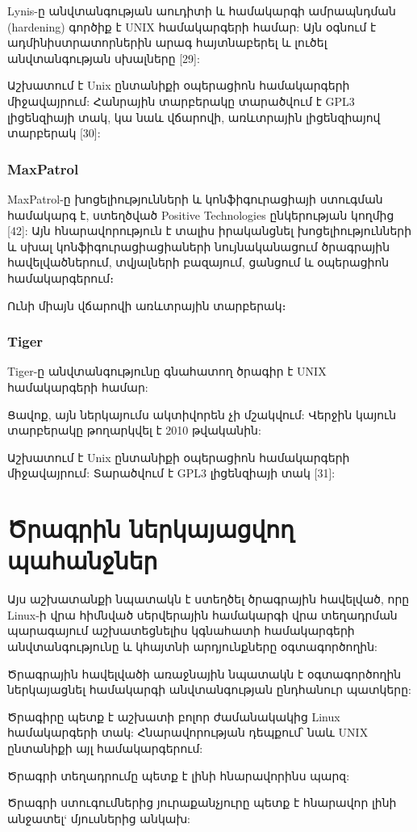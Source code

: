 \documentclass[a4paper,12pt]{article}
\begin{document}
\begin{sloppypar}
Lynis-ը անվտանգության աուդիտի և համակարգի ամրապնդման (hardening)
գործիք է UNIX համակարգերի համար:
Այն օգնում է ադմինիստրատորներին արագ հայտնաբերել և լուծել
անվտանգության սխալները [29]:

Աշխատում է Unix ընտանիքի օպերացիոն համակարգերի միջավայրում:
Հանրային տարբերակը տարածվում է GPL3 լիցենզիայի տակ, կա նաև վճարովի,
առևտրային լիցենզիայով տարբերակ [30]:


\subsubsection{MaxPatrol}


MaxPatrol-ը խոցելիությունների և կոնֆիգուրացիայի ստուգման համակարգ է,
ստեղծված Positive Technologies ընկերության կողմից [42]:
Այն հնարավորություն է տալիս իրականցնել խոցելիությունների և սխալ
կոնֆիգուրացիացիաների նույնականացում ծրագրային հավելվածներում,
տվյալների բազայում, ցանցում և օպերացիոն համակարգերում։

Ունի միայն վճարովի առևտրային տարբերակ։


\subsubsection{Tiger}


Tiger-ը անվտանգությունը գնահատող ծրագիր է UNIX համակարգերի համար:

Ցավոք, այն ներկայումս ակտիվորեն չի մշակվում: Վերջին կայուն տարբերակը
թողարկվել է 2010 թվականին:

Աշխատում է Unix ընտանիքի օպերացիոն համակարգերի միջավայրում:
Տարածվում է GPL3 լիցենզիայի տակ [31]:


\section{Ծրագրին ներկայացվող պահանջներ}


Այս աշխատանքի նպատակն է ստեղծել ծրագրային հավելված, որը Linux-ի
վրա հիմնված սերվերային համակարգի վրա տեղադրման պարագայում
աշխատեցնելիս կգնահատի համակարգերի անվտանգությունը և կհայտնի
արդյունքները օգտագործողին:

Ծրագրային հավելվածի առաջնային նպատակն է օգտագործողին ներկայացնել
համակարգի անվտանգության ընդհանուր պատկերը:

Ծրագիրը պետք է աշխատի բոլոր ժամանակակից Linux համակարգերի տակ:
Հնարավորության դեպքում՝ նաև UNIX ընտանիքի այլ համակարգերում:

Ծրագրի տեղադրումը պետք է լինի հնարավորինս պարզ:

Ծրագրի ստուգումներից յուրաքանչյուրը պետք է հնարավոր լինի անջատել`
մյուսներից անկախ:


\end{sloppypar}
\end{document}
